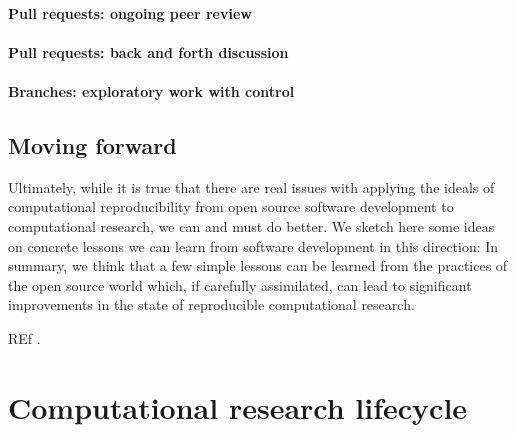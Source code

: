 \documentclass[ChapterTOCs,krantz2]{krantz} %
\begin{document}
\paragraph{ {\bf Pull requests: ongoing peer review}}

\paragraph{ {\bf Pull requests: back and forth discussion}}

\paragraph{ {\bf Branches: exploratory work with control}}


\subsection{Moving forward }

Ultimately, while it is true that there are real issues with applying
the ideals of computational reproducibility from open source software
development to computational research, we can and must do better.
We sketch here some ideas on concrete lessons we can learn from software
development in this direction:
In summary, we think that a few simple lessons can be learned from
the practices of the open source world which, if carefully assimilated,
can lead to significant improvements in the state of reproducible
computational research. 

REf \cite{10.3389/fncom.2012.00018}.

\section{\label{sec:lifecycle}Computational research lifecycle}
\end{document}
